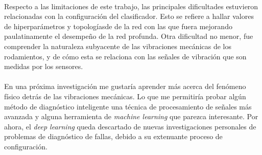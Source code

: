 \documentclass[a4paper,12pt]{article}
\begin{document}
\paragraph{}
Respecto a las limitaciones de este trabajo, las principales dificultades estuvieron relacionadas con la configuración del clasificador. Esto se refiere a hallar valores de hiperparámetros y topologíasde de la red con las que fuera mejorando paulatinamente el desempeño de la red profunda. Otra dificultad no menor, fue comprender la naturaleza subyacente de las vibraciones mecánicas de los rodamientos, y de cómo esta se relaciona con las señales de vibración que son medidas por los sensores. 

\paragraph{}
En una próxima investigación me gustaría aprender más acerca del fenómeno físico detrás de las vibraciones mecánicas. Lo que me permitiría probar algún método de diagnóstico inteligente una técnica de procesamiento de señales más avanzada y alguna herramienta de \textit{machine learning} que parezca interesante. Por ahora, el \textit{deep learning} queda descartado de nuevas investigaciones personales de problemas de diagnóstico de fallas, debido a su extenuante proceso de configuración.

\clearpage
\end{document}
